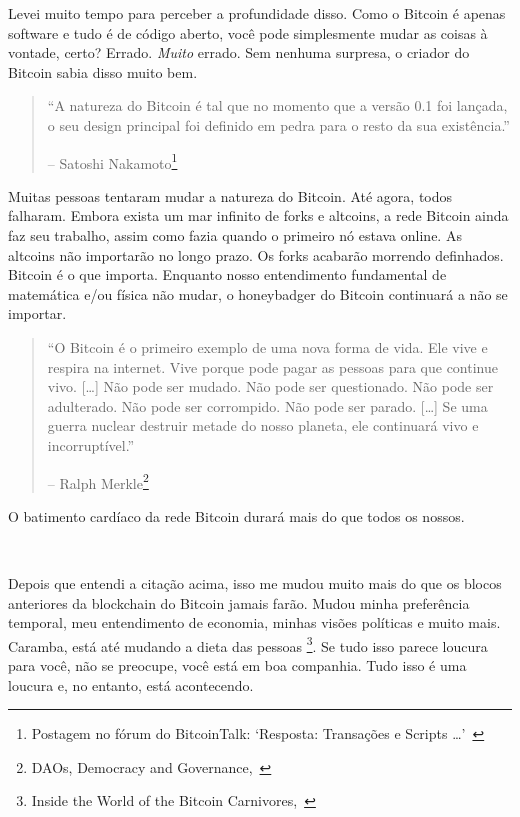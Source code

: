 Levei muito tempo para perceber a profundidade disso. Como o Bitcoin é apenas software e tudo é de código aberto, você pode simplesmente mudar as coisas à vontade, certo? Errado. \textit {Muito} errado. Sem nenhuma surpresa, o criador do Bitcoin sabia disso muito bem.

\begin{quotation}\begin{samepage}
\enquote{A natureza do Bitcoin é tal que no momento que a versão 0.1 foi lançada, o seu design principal foi definido em pedra para o resto da sua existência.}
\begin{flushright} -- Satoshi Nakamoto\footnote{Postagem no fórum do BitcoinTalk: `Resposta: Transações e Scripts \ldots'~\cite{satoshi-set-in-stone}}
\end{flushright}\end{samepage}\end{quotation}

Muitas pessoas tentaram mudar a natureza do Bitcoin. Até agora, todos falharam. Embora exista um mar infinito de forks e altcoins, a rede Bitcoin ainda faz seu trabalho, assim como fazia quando o primeiro nó estava online. As altcoins não importarão no longo prazo. Os forks acabarão morrendo definhados. Bitcoin é o que importa. Enquanto nosso entendimento fundamental de matemática e/ou física não mudar, o honeybadger do Bitcoin continuará a não se importar.


\begin{quotation}\begin{samepage}
\enquote{O Bitcoin é o primeiro exemplo de uma nova forma de vida. Ele vive e respira na internet. Vive porque pode pagar as pessoas para que continue vivo. [\ldots] Não pode ser mudado. Não pode ser questionado. Não pode ser adulterado. Não pode ser corrompido. Não pode ser parado. [\ldots] Se uma guerra nuclear destruir metade do nosso planeta, ele continuará vivo e incorruptível.}
\begin{flushright} -- Ralph Merkle\footnote{DAOs, Democracy and
Governance,~\cite{merkle-dao}}
\end{flushright}\end{samepage}\end{quotation}

O batimento cardíaco da rede Bitcoin durará mais do que todos os nossos.

~

Depois que entendi a citação acima, isso me mudou muito mais do que os blocos anteriores da blockchain do Bitcoin jamais farão. Mudou minha preferência temporal, meu entendimento de economia, minhas visões políticas e muito mais. Caramba, está até mudando a dieta das pessoas \footnote{Inside the World of the Bitcoin
Carnivores,~\cite{carnivores}}. Se tudo isso parece loucura para você, não se preocupe, você está em boa companhia. Tudo isso é uma loucura e, no entanto, está acontecendo.

